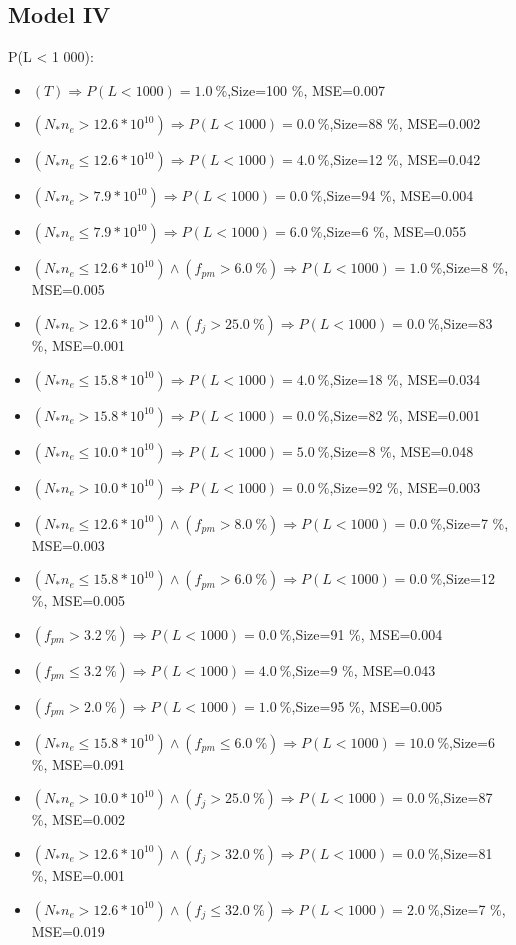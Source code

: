 \documentclass[numbered]{CSL}
\begin{document}
\subsection{Model IV}
P(L < 1 000):
\begin{itemize}
\item $(T) \Rightarrow P(L < 1 000) = 1.0~\%$,\hfill Size=100 \%, MSE=0.007
\item $(N_* n_e > 12.6 * 10^{10}) \Rightarrow P(L < 1 000) = 0.0~\%$,\hfill Size=88 \%, MSE=0.002
\item $(N_* n_e \leq 12.6 * 10^{10}) \Rightarrow P(L < 1 000) = 4.0~\%$,\hfill Size=12 \%, MSE=0.042
\item $(N_* n_e > 7.9 * 10^{10}) \Rightarrow P(L < 1 000) = 0.0~\%$,\hfill Size=94 \%, MSE=0.004
\item $(N_* n_e \leq 7.9 * 10^{10}) \Rightarrow P(L < 1 000) = 6.0~\%$,\hfill Size=6 \%, MSE=0.055
\item $(N_* n_e \leq 12.6 * 10^{10}) \land (f_{pm} > 6.0~\%) \Rightarrow P(L < 1 000) = 1.0~\%$,\hfill Size=8 \%, MSE=0.005
\item $(N_* n_e > 12.6 * 10^{10}) \land (f_j > 25.0~\%) \Rightarrow P(L < 1 000) = 0.0~\%$,\hfill Size=83 \%, MSE=0.001
\item $(N_* n_e \leq 15.8 * 10^{10}) \Rightarrow P(L < 1 000) = 4.0~\%$,\hfill Size=18 \%, MSE=0.034
\item $(N_* n_e > 15.8 * 10^{10}) \Rightarrow P(L < 1 000) = 0.0~\%$,\hfill Size=82 \%, MSE=0.001
\item $(N_* n_e \leq 10.0 * 10^{10}) \Rightarrow P(L < 1 000) = 5.0~\%$,\hfill Size=8 \%, MSE=0.048
\item $(N_* n_e > 10.0 * 10^{10}) \Rightarrow P(L < 1 000) = 0.0~\%$,\hfill Size=92 \%, MSE=0.003
\item $(N_* n_e \leq 12.6 * 10^{10}) \land (f_{pm} > 8.0~\%) \Rightarrow P(L < 1 000) = 0.0~\%$,\hfill Size=7 \%, MSE=0.003
\item $(N_* n_e \leq 15.8 * 10^{10}) \land (f_{pm} > 6.0~\%) \Rightarrow P(L < 1 000) = 0.0~\%$,\hfill Size=12 \%, MSE=0.005
\item $(f_{pm} > 3.2~\%) \Rightarrow P(L < 1 000) = 0.0~\%$,\hfill Size=91 \%, MSE=0.004
\item $(f_{pm} \leq 3.2~\%) \Rightarrow P(L < 1 000) = 4.0~\%$,\hfill Size=9 \%, MSE=0.043
\item $(f_{pm} > 2.0~\%) \Rightarrow P(L < 1 000) = 1.0~\%$,\hfill Size=95 \%, MSE=0.005
\item $(N_* n_e \leq 15.8 * 10^{10}) \land (f_{pm} \leq 6.0~\%) \Rightarrow P(L < 1 000) = 10.0~\%$,\hfill Size=6 \%, MSE=0.091
\item $(N_* n_e > 10.0 * 10^{10}) \land (f_j > 25.0~\%) \Rightarrow P(L < 1 000) = 0.0~\%$,\hfill Size=87 \%, MSE=0.002
\item $(N_* n_e > 12.6 * 10^{10}) \land (f_j > 32.0~\%) \Rightarrow P(L < 1 000) = 0.0~\%$,\hfill Size=81 \%, MSE=0.001
\item $(N_* n_e > 12.6 * 10^{10}) \land (f_j \leq 32.0~\%) \Rightarrow P(L < 1 000) = 2.0~\%$,\hfill Size=7 \%, MSE=0.019
\end{itemize}
\end{document}

